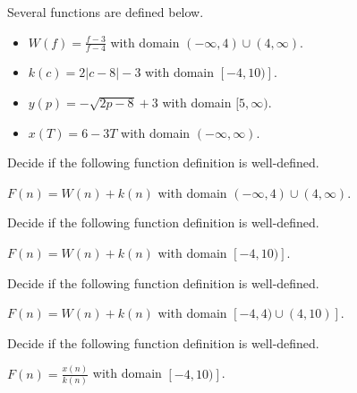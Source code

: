 \documentclass{ximera}
\begin{document}
\begin{definition}
Several functions are defined below.
\begin{itemize}
\item $W(f) = \frac{f-3}{f-4}$ with domain $(-\infty, 4) \cup (4, \infty)$. 
\item $k(c) = 2| c - 8 | - 3$ with domain $[-4, 10)]$. 
\item $y(p) = -\sqrt{2p - 8} + 3$ with domain $[5, \infty)$. 
\item $x(T) = 6 - 3T$ with domain $(-\infty, \infty)$. 
\end{itemize}
\end{definition}



\begin{exercise}
Decide if the following function definition is well-defined.

$F(n) = W(n) + k(n)$ with domain $(-\infty, 4) \cup (4, \infty)$.

\begin{multipleChoice}
\end{multipleChoice}

\end{exercise}



\begin{exercise}
Decide if the following function definition is well-defined.

$F(n) = W(n) + k(n)$ with domain $[-4, 10)]$.

\begin{multipleChoice}
\end{multipleChoice}

\end{exercise}




\begin{exercise}
Decide if the following function definition is well-defined.

$F(n) = W(n) + k(n)$ with domain $[-4, 4) \cup (4, 10)]$.

\begin{multipleChoice}
\end{multipleChoice}

\end{exercise}





\begin{exercise}
Decide if the following function definition is well-defined.

$F(n) = \frac{x(n)}{k(n)}$ with domain $[-4, 10)]$.

\begin{multipleChoice}
\end{multipleChoice}

\end{exercise}
\end{document}
